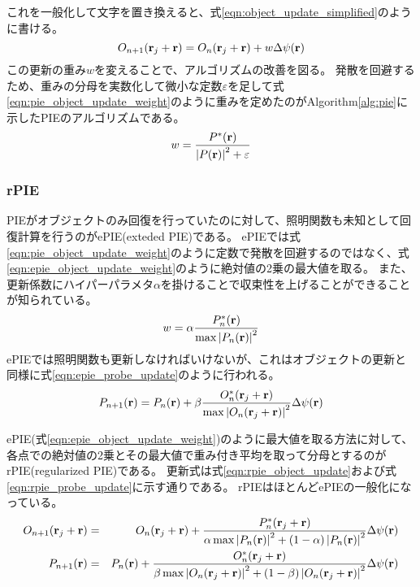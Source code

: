 これを一般化して文字を置き換えると、式\ref{eqn:object_update_simplified}のように書ける。
\begin{equation}
\label{eqn:object_update_simplified}
  O_{n+1}(\mathbf{r}_j + \mathbf{r}) = O_n(\mathbf{r}_j + \mathbf{r}) + w \Delta\psi(\mathbf{r})
\end{equation}
この更新の重み$w$を変えることで、アルゴリズムの改善を図る。
発散を回避するため、重みの分母を実数化して微小な定数$\varepsilon$を足して式\ref{eqn:pie_object_update_weight}のように重みを定めたのがAlgorithm\ref{alg:pie}に示したPIEのアルゴリズムである。
\begin{equation}
  \label{eqn:pie_object_update_weight}
  w = \frac{P^*(\mathbf{r})}{\left| P(\mathbf{r}) \right|^2 + \varepsilon}
\end{equation}

\subsubsection{rPIE}
PIEがオブジェクトのみ回復を行っていたのに対して、照明関数も未知として回復計算を行うのがePIE(exteded PIE)である。
ePIEでは式\ref{eqn:pie_object_update_weight}のように定数で発散を回避するのではなく、式\ref{eqn:epie_object_update_weight}のように絶対値の2乗の最大値を取る。
また、更新係数にハイパーパラメタ$\alpha$を掛けることで収束性を上げることができることが知られている。
\begin{equation}
  \label{eqn:epie_object_update_weight}
  w = \alpha \frac{P_n^*(\mathbf{r})}{\max \left| P_n(\mathbf{r}) \right|^2}
\end{equation}
ePIEでは照明関数も更新しなければいけないが、これはオブジェクトの更新と同様に式\ref{eqn:epie_probe_update}のように行われる。
\begin{equation}
\label{eqn:epie_probe_update}
  P_{n+1}(\mathbf{r}) 
  = P_n(\mathbf{r}) 
  + \beta \frac{O_n^*(\mathbf{r}_j + \mathbf{r})}{\max \left| O_n(\mathbf{r}_j + \mathbf{r}) \right|^2} \Delta\psi(\mathbf{r})
\end{equation}

ePIE(式\ref{eqn:epie_object_update_weight})のように最大値を取る方法に対して、各点での絶対値の2乗とその最大値で重み付き平均を取って分母とするのがrPIE(regularized PIE)である。
更新式は式\ref{eqn:rpie_object_update}および式\ref{eqn:rpie_probe_update}に示す通りである。
rPIEはほとんどePIEの一般化になっている。
\begin{eqnarray}
  O_{n+1}(\mathbf{r}_j + \mathbf{r}) &=& O_n(\mathbf{r}_j + \mathbf{r}) 
    + \frac{P_n^*(\mathbf{r}_j + \mathbf{r})}
      {\alpha \max \left| P_n(\mathbf{r}) \right|^2 + (1-\alpha) \left| P_n(\mathbf{r}) \right|^2}
    \Delta\psi(\mathbf{r}) \label{eqn:rpie_object_update} \\
  P_{n+1}(\mathbf{r}) &=& P_n(\mathbf{r}) 
    + \frac{O_n^*(\mathbf{r}_j + \mathbf{r})}
      {\beta \max \left| O_n(\mathbf{r}_j + \mathbf{r}) \right|^2 + (1-\beta) \left| O_n(\mathbf{r}_j + \mathbf{r}) \right|^2}
    \Delta\psi(\mathbf{r}) \label{eqn:rpie_probe_update}
\end{eqnarray}

